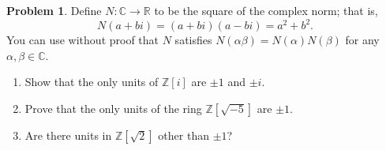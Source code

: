 \documentclass[11pt]{article}
\newcommand{\C}{\mathbb{C}}
\newcommand{\R}{\mathbb{R}}
\newcommand{\ZZ}{\mathbb{Z}}
\theoremstyle{definition}
\newtheorem{problem}{Problem}
\begin{document}
\begin{problem}
Define $N\!: \C \to \R$ to be the square of the complex norm; that is,  
$$N(a+bi) = (a+bi)(a-bi) = a^2+b^2.$$
You can use without proof that $N$ satisfies $N(\alpha \beta)=N(\alpha)N(\beta)$ for any $\alpha, \beta \in \C$.

\begin{enumerate}[label=(5.\arabic*),itemsep=0.1em]
\vspace{-0.5em}
\item Show that the only units of $\ZZ[i]$ are $\pm 1$ and $\pm i$.

\item Prove that the only units of the ring $\ZZ[\sqrt{-5}]$ are $\pm 1$.
  
\item Are there units in $\ZZ[\sqrt{2}]$ other than $\pm 1$? 
\end{enumerate}
\end{problem}
\end{document}
